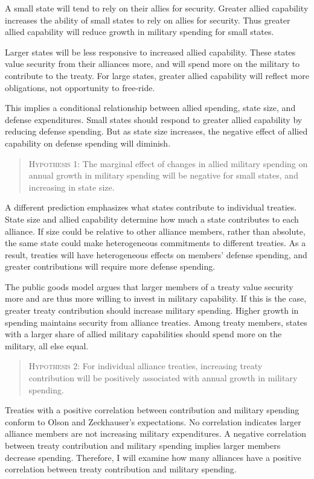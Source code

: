 \documentclass[12pt]{article}
\begin{document}
A small state will tend to rely on their allies for security. 
Greater allied capability increases the ability of small states to rely on allies for security. 
Thus greater allied capability will reduce growth in military spending for small states.

 
Larger states will be less responsive to increased allied capability. 
These states value security from their alliances more, and will spend more on the military to contribute to the treaty. 
For large states, greater allied capability will reflect more obligations, not opportunity to free-ride.


This implies a conditional relationship between allied spending, state size, and defense expenditures. 
Small states should respond to greater allied capability by reducing defense spending. 
But as state size increases, the negative effect of allied capability on defense spending will diminish. 


\begin{quote}
\textsc{Hypothesis 1}: The marginal effect of changes in allied military spending on annual growth in military spending will be negative for small states, and increasing in state size. 
\end{quote}


A different prediction emphasizes what states contribute to individual treaties. 
State size and allied capability determine how much a state contributes to each alliance.
If size could be relative to other alliance members, rather than absolute, the same state could make heterogeneous commitments to different treaties. 
As a result, treaties will have heterogeneous effects on members' defense spending, and greater contributions will require more defense spending. 

 
The public goods model argues that larger members of a treaty value security more and are thus more willing to invest in military capability.
If this is the case, greater treaty contribution should increase military spending. 
Higher growth in spending maintains security from alliance treaties. 
Among treaty members, states with a larger share of allied military capabilities should spend more on the military, all else equal. 


\begin{quote}
\textsc{Hypothesis 2}: For individual alliance treaties, increasing treaty contribution will be positively associated with annual growth in military spending. 
\end{quote}


Treaties with a positive correlation between contribution and military spending conform to Olson and Zeckhauser's expectations. 
No correlation indicates larger alliance members are not increasing military expenditures.
A negative correlation between treaty contribution and military spending implies larger members decrease spending. 
Therefore, I will examine how many alliances have a positive correlation between treaty contribution and military spending.  
\end{document}
